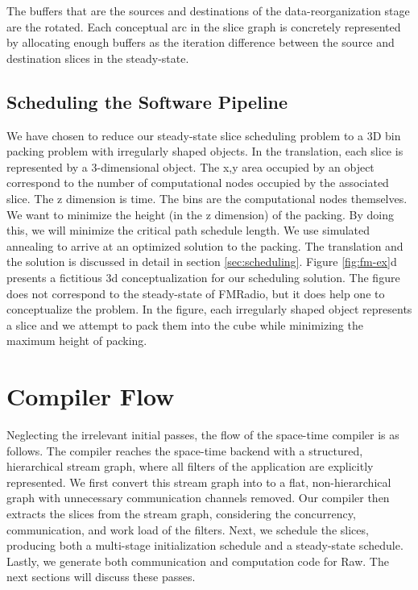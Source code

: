 The buffers that are the sources and destinations of the
data-reorganization stage are the rotated.  Each conceptual arc in the
slice graph is concretely represented by allocating enough buffers as
the iteration difference between the source and destination slices in
the steady-state.

\subsection{Scheduling the Software Pipeline}
We have chosen to reduce our steady-state slice scheduling problem to
a 3D bin packing problem \cite{binpacking} with irregularly shaped
objects.  In the translation, each slice is represented by a
3-dimensional object.  The x,y area occupied by an object correspond
to the number of computational nodes occupied by the associated
slice. The z dimension is time.  The bins are the computational nodes
themselves.  We want to minimize the height (in the z dimension) of
the packing.  By doing this, we will minimize the critical path
schedule length.  We use simulated annealing to arrive at an optimized
solution to the packing.  The translation and the solution is
discussed in detail in section \ref{sec:scheduling}. Figure
\ref{fig:fm-ex}d presents a fictitious 3d conceptualization for
our scheduling solution.  The figure does not correspond to the
steady-state of FMRadio, but it does help one to conceptualize the
problem. In the figure, each irregularly shaped object represents a
slice and we attempt to pack them into the cube while minimizing the
maximum height of packing.

\section{Compiler Flow}
Neglecting the irrelevant initial passes, the flow of the space-time
compiler is as follows.  The compiler reaches the space-time backend
with a structured, hierarchical stream graph, where all filters of the
application are explicitly represented.  We first convert this stream
graph into to a flat, non-hierarchical graph with unnecessary
communication channels removed.  Our compiler then extracts the
slices from the stream graph, considering the concurrency,
communication, and work load of the filters.
Next, we schedule the slices, producing both a multi-stage
initialization schedule and a steady-state schedule.  Lastly, we
generate both communication and computation code for Raw.  The next
sections will discuss these passes.